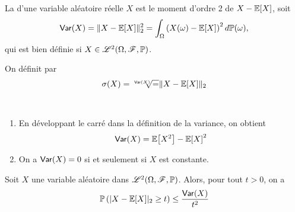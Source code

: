 \begin{definition}
    La  d'une variable aléatoire réelle \(X\) est le 
    moment d'ordre 2 de \(X-\mathbb{E}\mathopen{}\left[X\right]\mathclose{}\), soit
    \begin{equation*}
        \operatorname{\mathsf{Var}}(X) = \mathopen{}\left\|X-\mathbb{E}\mathopen{}\left[X\right]\mathclose{}\right\|\mathclose{}_2^2 = \int_{\Omega}{\left(X(\omega) -\mathbb{E}\mathopen{}\left[X\right]\mathclose{}\right)}^2\mathop{}\!{d}\mathbb{P}(\omega),
    \end{equation*}
    qui est bien définie si \(X\in\mathscr{L}^2(\Omega, \mathscr{F}, \mathbb{P})\).

    On définit  par
    \begin{equation*}
        \sigma(X) = \sqrt[\operatorname{\mathsf{Var}}(X)] = \mathopen{}\left\|X-\mathbb{E}\mathopen{}\left[X\right]\mathclose{}\right\|\mathclose{}_2
    \end{equation*}
\end{definition}

\begin{remark}\,
    \begin{enumerate}
        \item En développant le carré dans la définition de la variance,
        on obtient
        \begin{equation*}
            \operatorname{\mathsf{Var}}(X) = \mathbb{E}\mathopen{}\left[X^2\right]\mathclose{} - {\mathbb{E}\mathopen{}\left[X\right]\mathclose{}}^2
        \end{equation*}

        \item On a \(\operatorname{\mathsf{Var}}(X) = 0\) si et seulement si \(X\)
        est constante.
    \end{enumerate}
\end{remark}

\begin{proposition}
    Soit \(X\) une variable aléatoire dans \(\mathscr{L}^2(\Omega, \mathscr{F}, \mathbb{P})\).
    Alors, pour tout \(t>0\), on a
    \begin{equation*}
        \mathbb{P}\left(\mathopen{}\left|X-\mathbb{E}\mathopen{}\left[X\right]\mathclose{}\right|\mathclose{}_2\geq t\right)\leq \frac{\operatorname{\mathsf{Var}}(X)}{t^2}
    \end{equation*}
\end{proposition}

